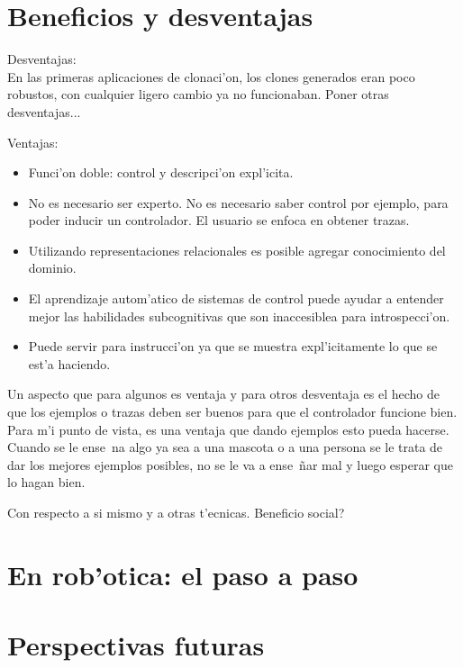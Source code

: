 \documentclass[11pt]{article}
\begin{document}
\section{Beneficios y desventajas}

Desventajas:\\
En las primeras aplicaciones de clonaci'on, los clones generados eran poco robustos, con cualquier ligero cambio ya no funcionaban. Poner otras desventajas...

Ventajas:
\begin{itemize}
\item Funci'on doble: control y descripci'on expl'icita.
\item No es necesario ser experto. No es necesario saber control por ejemplo, para poder inducir un controlador. El usuario se enfoca en obtener trazas.
\item Utilizando representaciones relacionales es posible agregar conocimiento del dominio.
\item El aprendizaje autom'atico de sistemas de control puede ayudar a entender mejor las habilidades subcognitivas que son inaccesiblea para introspecci'on.
\item Puede servir para instrucci'on ya que se muestra expl'icitamente lo que se est'a haciendo.
\end{itemize}

Un aspecto que para algunos es ventaja y para otros desventaja es el hecho de que los ejemplos o trazas deben ser buenos para que el controlador funcione bien. Para m'i punto de vista, es una ventaja que dando ejemplos esto pueda hacerse. Cuando se le ense~na algo ya sea a una mascota o a una persona se le trata de dar los mejores ejemplos posibles, no se le va a ense~ñar mal y luego esperar que lo hagan bien. 

Con respecto a si mismo y a otras t'ecnicas. Beneficio social?
\section{En rob'otica: el paso a paso}
\section{Perspectivas futuras}



\end{document}
